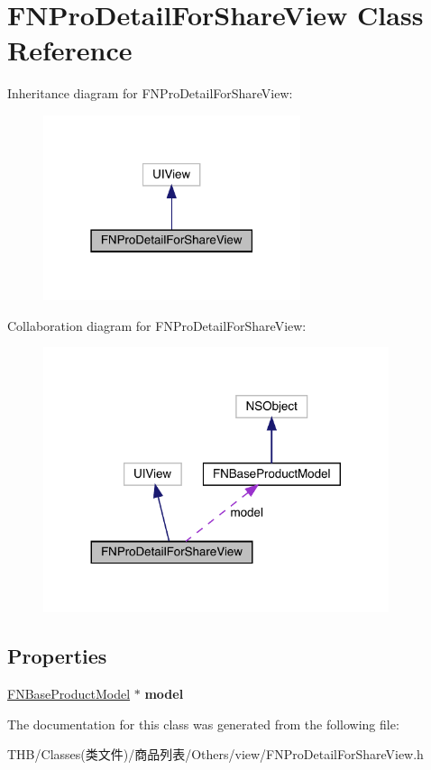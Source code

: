 \hypertarget{interface_f_n_pro_detail_for_share_view}{}\section{F\+N\+Pro\+Detail\+For\+Share\+View Class Reference}
\label{interface_f_n_pro_detail_for_share_view}


Inheritance diagram for F\+N\+Pro\+Detail\+For\+Share\+View\+:\nopagebreak
\begin{figure}[H]
\begin{center}
\leavevmode
\includegraphics[width=214pt]{interface_f_n_pro_detail_for_share_view__inherit__graph}
\end{center}
\end{figure}


Collaboration diagram for F\+N\+Pro\+Detail\+For\+Share\+View\+:\nopagebreak
\begin{figure}[H]
\begin{center}
\leavevmode
\includegraphics[width=287pt]{interface_f_n_pro_detail_for_share_view__coll__graph}
\end{center}
\end{figure}
\subsection*{Properties}
\begin{DoxyCompactItemize}
\item 
\mbox{\label{interface_f_n_pro_detail_for_share_view_a7c71d352a80b68c72814422364189f2f}} 
\mbox{\hyperlink{interface_f_n_base_product_model}{F\+N\+Base\+Product\+Model}} $\ast$ {\bfseries model}
\end{DoxyCompactItemize}


The documentation for this class was generated from the following file\+:\begin{DoxyCompactItemize}
\item 
T\+H\+B/\+Classes(类文件)/商品列表/\+Others/view/F\+N\+Pro\+Detail\+For\+Share\+View.\+h\end{DoxyCompactItemize}
